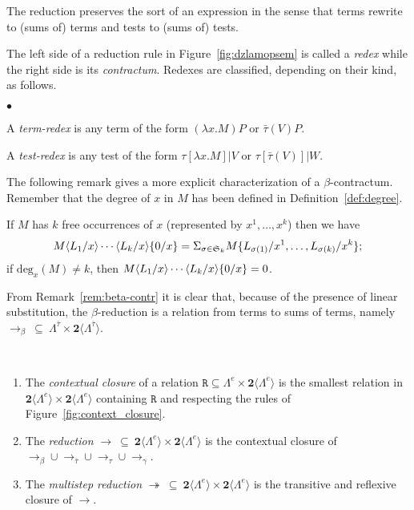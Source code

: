 \documentclass{LMCS}
\newcommand{\bool}{\mathbf{2}}
\newcommand{\perm}[1]{\mathfrak{S}_{#1}}
\newcommand{\lam}{\ensuremath{\lambda}}
\newcommand{\paral}{\vert}
\newcommand{\Set}[1]{\Lambda^{#1}}
\newcommand{\sums}[1]{\bool\langle\Set{#1}\rangle}
\newcommand{\msto}{\twoheadrightarrow}
\newcommand{\subst}[2]{\{ #2 / #1 \}}	\newcommand{\dg}[2]{\mathrm{deg}_{#1}(#2)} \newcommand{\obsle}{\sqsubseteq_{\mathcal{O}}}
\newcommand{\gt}{\ensuremath{\tau}}
\newcommand{\gto}{\ensuremath{\bar\tau}}
\begin{document}
The reduction preserves the sort of an expression in the sense that terms rewrite to (sums of) terms and tests to (sums of) tests.

The left side of a reduction rule in Figure~\ref{fig:dzlamopsem} is called a \emph{redex} while the right side is its \emph{contractum}.
Redexes are classified, depending on their kind, as follows.

\begin{defi}\label{def:redex}\hfill
\begin{iteMize}{$\bullet$}
\item
	A \emph{term-redex} is any term of the form $(\lam x.M)P$ or $\gto(V)P$.
\item
	A \emph{test-redex} is any test of the form $\gt[\lam x.M] \paral V$ or $\gt[\gto(V)]\paral W$.
\end{iteMize}
\end{defi}


The following remark gives a more explicit characterization of a $\beta$-contractum. 
Remember that the degree of $x$ in $M$ has been defined in Definition~\ref{def:degree}.

\begin{rem}\label{rem:beta-contr}
If $M$ has $k$ free occurrences of $x$ (represented by $x^1,\dots,x^k$) then we have 
$$ M\lsubst{x}{L_1}\cdots\lsubst{x}{L_k}\subst{x}{0} = \Sigma_{\sigma \in \perm{k}} M\{L_{\sigma(1)}/x^1,\ldots,L_{\sigma(k)}/x^k\}; $$
if $\dg{x}{M} \neq k$, then $M\lsubst{x}{L_1}\cdots\lsubst{x}{L_k}\subst{x}{0} = 0$.
\end{rem}

From Remark~\ref{rem:beta-contr} it is clear that, because of the presence of linear substitution, 
the $\beta$-reduction is a relation from terms to sums of terms, namely $\to_\beta\ \subseteq\ \Set{\gto}\times\sums{\gto}$.


\begin{defi} \
\begin{enumerate}[1.]
\item The \emph{contextual closure} of a relation $\texttt{R}\subseteq\Set{e}\times\sums{e}$ is 
the smallest relation in $\sums{e}\times\sums{e}$ containing $\texttt{R}$ and respecting the rules of Figure~\ref{fig:context_closure}.
\item The \emph{reduction} $\to\ \subseteq\ \sums{e}\times\sums{e}$ is the contextual closure of $\to_{\beta}\cup\to_{\gto}\cup\to_{\gt}\cup\to_{\gamma}$.
\item The \emph{multistep reduction} $\msto\ \subseteq\ \sums{e}\times\sums{e}$ is the transitive and reflexive closure of $\to$.
\end{enumerate}
\end{defi}
\end{document}
